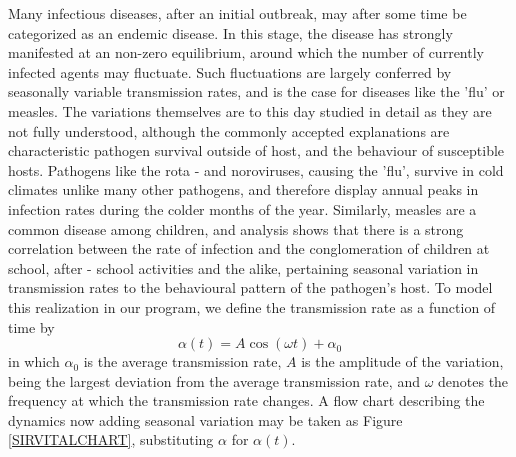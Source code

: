 Many infectious diseases, after an initial outbreak, may after some time be categorized as an endemic disease. In this stage, the disease has strongly manifested at an non-zero equilibrium, around which the number of currently infected agents may fluctuate. Such fluctuations are largely conferred by seasonally variable transmission rates, and is the case for diseases like the 'flu' or measles. The variations themselves are to this day studied in detail as they are not fully understood, although the commonly accepted explanations are characteristic pathogen survival outside of host, and the behaviour of susceptible hosts\cite{seasonal1}\cite{seasonal2}. Pathogens like the rota - and noroviruses, causing the 'flu', survive in cold climates unlike many other pathogens, and therefore display annual peaks in infection rates during the colder months of the year. Similarly, measles are a common disease among children, and analysis shows that there is a strong correlation between the rate of infection and the conglomeration of children at school, after - school  activities and the alike, pertaining seasonal variation in transmission rates to the behavioural pattern of the pathogen's host. To model this realization in our program, we define the transmission rate as a function of time by 
\begin{equation}
    \alpha(t) = A\cos(\omega t) + \alpha_0
\end{equation}
in which $\alpha_0$ is the average transmission rate, $A$ is the amplitude of the variation, being the largest deviation from the average transmission rate, and $\omega$ denotes the frequency at which the transmission rate changes. A flow chart describing the dynamics now adding seasonal variation may be taken as Figure \ref{SIRVITALCHART}, substituting $\alpha$ for $\alpha(t)$.\\

